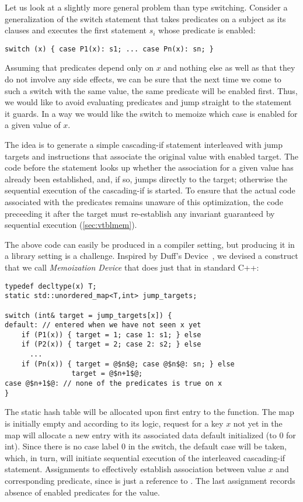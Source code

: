 Let us look at a slightly more general problem than type switching. Consider a 
generalization of the switch statement that takes predicates on a subject as its 
clauses and executes the first statement $s_i$ whose predicate is enabled: 

\begin{lstlisting}[keepspaces]
switch (x) { case P1(x): s1; ... case Pn(x): sn; }
\end{lstlisting}

\noindent
Assuming that predicates depend only on $x$ and nothing else as well as that 
they do not involve any side effects, we can be sure that the next time we come 
to such a switch with the same value, the same predicate will be enabled 
first. Thus, we would like to avoid evaluating predicates and jump straight to 
the statement it guards. In a way we would like the switch to  memoize which 
case is enabled for a given value of $x$.

The idea is to generate a simple cascading-if statement interleaved with jump 
targets and instructions that associate the original value with enabled target. 
The code before the statement looks up whether the association for a given value 
has already been established, and, if so, jumps directly to the target; otherwise 
the sequential execution of the cascading-if is started. To ensure 
that the actual code associated with the predicates remains unaware of this 
optimization, the code preceeding it after the target must re-establish any 
invariant guaranteed by sequential execution (\textsection\ref{sec:vtblmem}).

The above code can easily be produced in a compiler setting, but producing it in 
a library setting is a challenge. Inspired by Duff's Device~\cite{Duff}, 
we devised a construct that we call \emph{Memoization Device} that does just 
that in standard C++:

\begin{lstlisting}
typedef decltype(x) T;
static std::unordered_map<T,int> jump_targets;

switch (int& target = jump_targets[x]) {
default: // entered when we have not seen x yet
    if (P1(x)) { target = 1; case 1: s1; } else 
    if (P2(x)) { target = 2; case 2: s2; } else
      ...
    if (Pn(x)) { target = @$n$@; case @$n$@: sn; } else
                target = @$n+1$@;
case @$n+1$@: // none of the predicates is true on x
}
\end{lstlisting}

\noindent
The static  hash table will be allocated upon first entry 
to the function. The map is initially empty and according to its logic, 
request for a key $x$ not yet in the map will allocate a 
new entry with its associated data default initialized (to 0 for int). Since 
there is no case label 0 in the switch, the default case will be taken, which, in 
turn, will initiate sequential execution of the interleaved cascading-if 
statement. Assignments to  effectively establish association 
between value $x$ and corresponding predicate, since  is just a 
reference to . The last assignment records absence of 
enabled predicates for the value.

